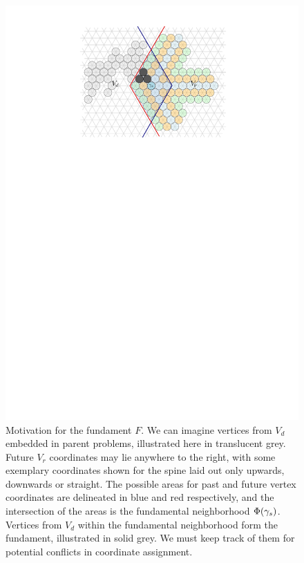 \begin{figure}
    \centering
    \includegraphics{graphics/ch4_reach.pdf}
    \caption[Motivation for the fundament $F$]{Motivation for the fundament $F$. We can imagine vertices from $V_d$ embedded in parent problems, illustrated here in translucent grey. Future $V_r$ coordinates may lie anywhere to the right, with some exemplary coordinates shown for the spine laid out only upwards, downwards or straight. The possible areas for past and future vertex coordinates are delineated in blue and red respectively, and the intersection of the areas is the fundamental neighborhood $\Phi(\gamma_s)$. Vertices from $V_d$ within the fundamental neighborhood form the fundament, illustrated in solid grey. We must keep track of them for potential conflicts in coordinate assignment.}
    \label{fig:ch4_reach}
\end{figure}

